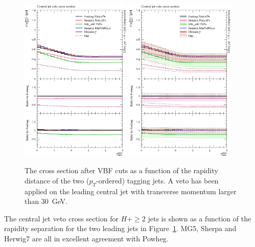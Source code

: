 \begin{figure}[t!]
  \centering
  \includegraphics[width=0.47\textwidth]{figures/hjetscomp_u_xs_central_jet_veto_VBF.pdf}
  \hfill
  \includegraphics[width=0.47\textwidth]{figures/hjetscomp_xs_central_jet_veto_VBF.pdf}
  \caption{
    The cross section after VBF cuts as a function of the rapidity
    distance of the two ($p_T$-ordered) tagging jets. A veto has been
    applied on the leading central jet with transverse momentum larger
    than 30~GeV.
    \label{fig:higgscomp:results:jvobs:cjvxsvbf}
  }
\end{figure}

The central jet veto cross section for $H+\ge2$ jets is shown as a
function of the rapidity separation for the two leading jets in
Figure~\ref{fig:higgscomp:results:jvobs:cjvxsvbf}. MG5, Sherpa and
Herwig7 are all in excellent agreement with Powheg.

